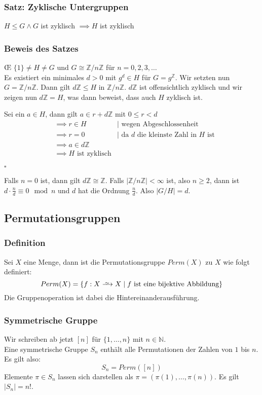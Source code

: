 \documentclass[12pt, german]{article}
\newcommand\iso{\xrightarrow{
		\,\smash{\raisebox{-0.65ex}{\ensuremath{\scriptstyle\sim}}}\,}}
\newcommand{\Z}{\mathbb{Z}}
\newcommand{\bewiesen}{
	
	\begin{flushright}
		$\square$  \\
\end{flushright}}
\begin{document}
	\subsubsection{Satz: Zyklische Untergruppen}
	$H \leq G \wedge G$ ist zyklisch $\implies H$ ist zyklisch
	
	\subsubsection{Beweis des Satzes}
	\OE  $\, \, \{1\} \not = H \not = G$ und  $G \cong \mathbb Z /n\mathbb Z$ für $n=0,2,3,\ldots$\\ 
	\newline
	Es existiert ein minimales $d > 0$ mit $g^d \in H$ für $G = g^{\mathbb Z}$.
	Wir setzten nun $G=\Z/n\Z$. Dann gilt $d\mathbb Z \leq H$ in $\mathbb Z /n\mathbb Z$. 
	$d\Z$ ist offensichtlich zyklisch und wir zeigen nun $d\mathbb Z = H$, was dann beweist, dass auch $H$ zyklisch ist. 
	
	Sei ein $a \in H$, dann gilt $a\in r + d\mathbb Z$ mit $0 \leq r < d$ 
	\begin{align*}
		&\implies r \in H &| \text{ wegen Abgeschlossenheit}\\
		&\implies r = 0 &| \text{ da } d \text{ die kleinste Zahl in } H  \text{ ist}\\
		&\implies a \in d\mathbb Z \\ 
		&\implies H \text{ ist zyklisch}
	\end{align*}
	\bewiesen
	Falls $n=0$ ist, dann gilt $d\mathbb Z \cong \mathbb Z$. Falls $|\Z /n\Z| < \infty$ ist, also $n \geq 2$, 
	dann ist $d\cdot \frac{n}{d} \equiv 0 \mod n$ und $d$ hat die Ordnung $\frac{n}{d}$. Also $|G/H|= d$.
	
	\subsection{Permutationsgruppen}
	\subsubsection{Definition}
	
	Sei $X$ eine Menge, dann ist die Permutationsgruppe $Perm(X)$ zu $X$ wie folgt definiert:
	$$Perm(X)= \{ f: X \iso X \mid f \text{ ist eine bijektive Abbildung}\}$$
	Die Gruppenoperation ist dabei die Hintereinanderausführung.
	
	\subsubsection{Symmetrische Gruppe}
	Wir schreiben ab jetzt $[n]$ für $\{1, \ldots, n\}$ mit $n \in \mathbb N$.  \\ 
	\newline
	Eine symmetrische Gruppe $S_n$ enthält alle Permutationen der Zahlen von $1$ bis $n$. Es gilt also: $$S_n = Perm([n])$$ 
	Elemente $\pi \in S_n$ lassen sich darstellen als $\pi = (\pi(1), \ldots, \pi(n))$.
	Es gilt $|S_n|=n!$.
	
\end{document}
